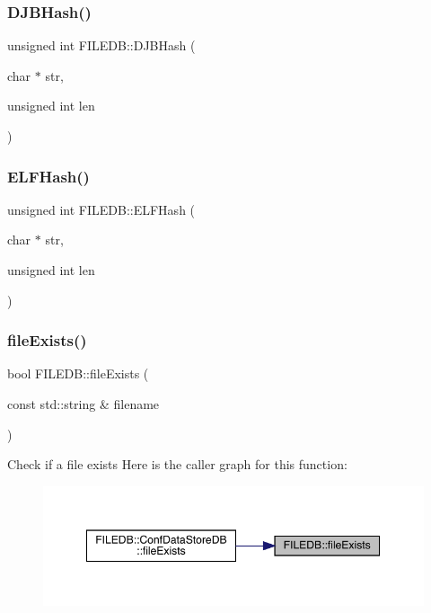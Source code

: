 \subsubsection{\texorpdfstring{DJBHash()}{DJBHash()}}
{\footnotesize\ttfamily unsigned int F\+I\+L\+E\+D\+B\+::\+D\+J\+B\+Hash (\begin{DoxyParamCaption}\item[{char $\ast$}]{str,  }\item[{unsigned int}]{len }\end{DoxyParamCaption})}

\mbox{\label{namespaceFILEDB_ad02d1b620691350d964deb5beab272eb}} 
\subsubsection{\texorpdfstring{ELFHash()}{ELFHash()}}
{\footnotesize\ttfamily unsigned int F\+I\+L\+E\+D\+B\+::\+E\+L\+F\+Hash (\begin{DoxyParamCaption}\item[{char $\ast$}]{str,  }\item[{unsigned int}]{len }\end{DoxyParamCaption})}

\mbox{\label{namespaceFILEDB_ae588550e41a7b104b78a0e81ceb24a46}} 
\subsubsection{\texorpdfstring{fileExists()}{fileExists()}}
{\footnotesize\ttfamily bool F\+I\+L\+E\+D\+B\+::file\+Exists (\begin{DoxyParamCaption}\item[{const std\+::string \&}]{filename }\end{DoxyParamCaption})}

Check if a file exists Here is the caller graph for this function\+:\nopagebreak
\begin{figure}[H]
\begin{center}
\leavevmode
\includegraphics[width=349pt]{d2/de6/namespaceFILEDB_ae588550e41a7b104b78a0e81ceb24a46_icgraph}
\end{center}
\end{figure}
\mbox{\label{namespaceFILEDB_a28e01191edebd63edee882e8c7af9325}} 

